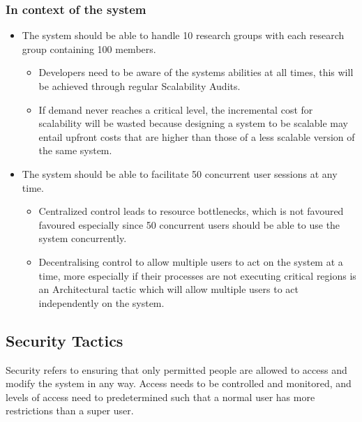 \documentclass[a4paper,10pt]{article}
\begin{document}
	\subsubsection{In context of the system}
		\begin{itemize}
			\item The system should be able to handle 10 research groups with each research group containing 100 members.
				\begin{itemize}
					\item Developers need to be aware of the systems abilities at all times, this will be achieved through regular Scalability Audits. 
					\item If demand never reaches a critical level, the incremental cost for scalability will be wasted because designing a system to be scalable may entail upfront costs that are higher than those of a less scalable version of the same system. 
				\end{itemize}
			\item The system should be able to facilitate 50 concurrent user sessions at any time.
				\begin{itemize}
					\item Centralized control leads to resource bottlenecks, which is not favoured favoured especially since 50 concurrent users should be able to use the system concurrently.  
					\item Decentralising control to allow multiple users to act on the system at a time, more especially if their processes are not executing critical regions is an Architectural tactic which will allow multiple users to act independently on the system. 
			\end{itemize}
		\end{itemize}

\subsection{Security Tactics} 
	Security refers to ensuring that only permitted people are allowed to access and modify the system in any way. Access needs to be controlled and monitored, and levels of access need to predetermined such that a normal user has more restrictions than a super user. 
\end{document}
